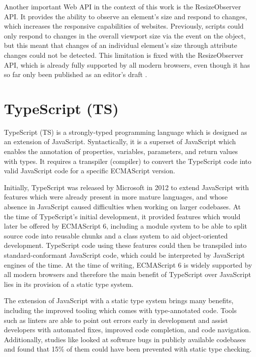 Another important Web API in the context of this work is the
ResizeObserver API. It provides the ability to observe an
element's size and respond to changes, which increases the responsive
capabilities of websites. Previously, scripts could only respond to
changes in the overall viewport size via the  event
on the  object, but this meant that changes of an
individual element's size through attribute changes could not be
detected. This limitation is fixed with the ResizeObserver
API, which is already fully supported by all modern browsers, even
though it has so far only been published as an editor's draft
\parencite{ResizeObserver}.






\section{TypeScript (TS)}
\label{sec:TS}

TypeScript (TS) is a strongly-typed programming language which is
designed as an extension of JavaScript. Syntactically, it is a
superset of JavaScript which enables the annotation of properties,
variables, parameters, and return values with types. It requires a
transpiler (compiler) to convert the TypeScript code into valid
JavaScript code for a specific ECMAScript version.

Initially, TypeScript was released by Microsoft in 2012
\parencite{TSFirstRelease} to extend JavaScript with features which
were already present in more mature languages, and whose absence in
JavaScript caused difficulties when working on larger codebases. At
the time of TypeScript's initial development, it provided features
which would later be offered by ECMAScript 6, including a module
system to be able to split source code into reusable chunks and a
class system to aid object-oriented development. TypeScript code using
these features could then be transpiled into standard-conformant
JavaScript code, which could be interpreted by JavaScript engines of
the time. At the time of writing, ECMAScript 6 is widely supported by
all modern browsers and therefore the main benefit of TypeScript over
JavaScript lies in its provision of a static type system.

The extension of JavaScript with a static type system brings many
benefits, including the improved tooling which comes with
type-annotated code. Tools such as linters \parencite{ESLint} are able
to point out errors early in development and assist developers with
automated fixes, improved code completion, and code navigation.
Additionally, studies like \textcite{ToTypeOrNotToType} looked at
software bugs in publicly available codebases and found that 15\% of
them could have been prevented with static type checking.

